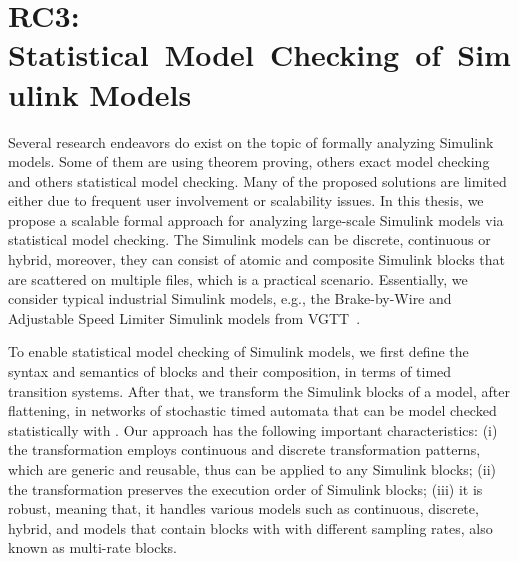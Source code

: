 \section[RC3: Statistical~Model~Checking~of~Simulink Models]{\large RC3: Statistical~Model~Checking~of~Simulink Models}\label{rc_sim}
Several research endeavors do exist on the topic of formally analyzing Simulink models. Some of them are using theorem proving, others exact model checking and others statistical model checking. Many of the proposed solutions are  limited either due to frequent user involvement or scalability issues. In this thesis, we propose a scalable formal approach for analyzing large-scale Simulink models via statistical model checking. The Simulink models can be discrete, continuous or hybrid, moreover, they can consist of atomic and composite Simulink blocks that are scattered on multiple files, which is a practical scenario. Essentially, we consider typical industrial Simulink models, e.g., the Brake-by-Wire and Adjustable Speed Limiter Simulink models from VGTT~\cite{Filipovikj2018SimppaalModels}.

To enable statistical model checking of Simulink models, we first define the syntax and semantics of blocks and their composition, in terms of timed transition systems. After that, we transform the Simulink blocks of a model, after flattening, in networks of stochastic timed automata that can be model checked statistically with \uppaalsmc.  Our approach has the following important characteristics: (i) the transformation employs continuous and discrete transformation patterns, which are generic and reusable, thus can be applied to any Simulink blocks; (ii) the transformation preserves the execution order of Simulink blocks; (iii) it is robust, meaning that, it handles various models such as continuous, discrete, hybrid, and models that contain blocks with with different sampling rates, also known as multi-rate blocks.

